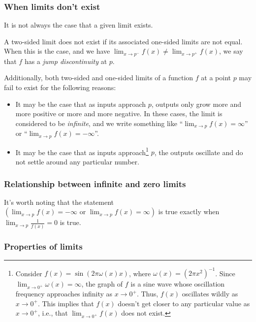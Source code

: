 \subsubsection*{When limits don't exist}

It is not always the case that a given limit exists. 

A two-sided limit does not exist if its associated one-sided limits are not equal. When this is the case, and we have $\lim_{x \rightarrow p^-} f(x) \neq \lim_{x \rightarrow p^+} f(x)$, we say that $f$ has a \textit{jump discontinuity} at $p$.

Additionally, both two-sided and one-sided limits of a function $f$ at a point $p$ may fail to exist for the following reasons:

\begin{itemize}
    \item It may be the case that as inputs approach $p$, outputs only grow more and more positive or more and more negative. In these cases, the limit is considered to be \textit{infinite}, and we write something like ``$\lim_{x \rightarrow p} f(x) = \infty$'' or ``$\lim_{x \rightarrow p} f(x) = -\infty$''.
    \item It may be the case that as inputs approach\footnote{Consider $f(x) = \sin(2 \pi \omega(x) x)$, where $\omega(x) = (2 \pi x^2)^{-1}$. Since $\lim_{x \rightarrow 0^+} \omega(x) = \infty$, the graph of $f$ is a sine wave whose oscillation frequency approaches infinity as $x \rightarrow 0^+$. Thus, $f(x)$ oscillates wildly as $x \rightarrow 0^+$. This implies that $f(x)$ doesn't get closer to any particular value as $x \rightarrow 0^+$, i.e., that $\lim_{x \rightarrow 0^+} f(x)$ does not exist.} $p$, the outputs oscillate and do not settle around any particular number.
\end{itemize}

\subsubsection*{Relationship between infinite and zero limits}

It's worth noting that the statement $(\lim_{x \rightarrow p} f(x) = - \infty \text{ or } \lim_{x \rightarrow p} f(x) = \infty)$ is true exactly when $\lim_{x \rightarrow p} \frac{1}{f(x)} = 0$ is true.

\subsubsection*{Properties of limits}

